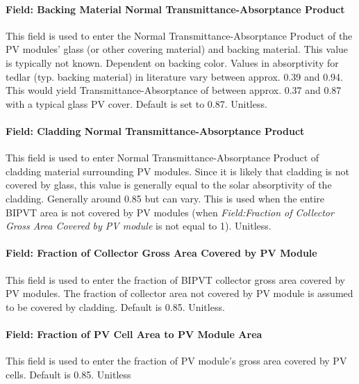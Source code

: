 \paragraph{Field: Backing Material Normal Transmittance-Absorptance Product}\label{BIPVT-field-backing-tau-alpha}

This field is used to enter the Normal Transmittance-Absorptance Product of the PV modules' glass (or other covering material) and backing material. This value is typically not known. Dependent on backing color. Values in absorptivity for tedlar (typ. backing material) in literature vary between approx. 0.39 and 0.94. This would yield Transmittance-Absorptance of between approx. 0.37 and 0.87 with a typical glass PV cover. Default is set to 0.87. Unitless.

\paragraph{Field: Cladding Normal Transmittance-Absorptance Product}\label{BIPVT-field-cladding-tau-alpha}

This field is used to enter Normal Transmittance-Absorptance Product of cladding material surrounding PV modules. Since it is likely that cladding is not covered by glass, this value is generally equal to the solar absorptivity of the cladding. Generally around 0.85 but can vary. This is used when the entire BIPVT area is not covered by PV modules (when \textit{Field:Fraction of Collector Gross Area Covered by PV module}  is not equal to 1). Unitless.


\paragraph{Field: Fraction of Collector Gross Area Covered by PV Module}\label{BIPVT-field-fraction-module}

This field is used to enter the fraction of BIPVT collector gross area covered by PV modules. The fraction of collector area not covered by PV module is assumed to be covered by cladding. Default is 0.85. Unitless.

\paragraph{Field: Fraction of PV Cell Area to PV Module Area}\label{BIPVT-field-fraction-PVcell}

This field is used to enter the fraction of PV module’s gross area covered by PV cells. Default is 0.85. Unitless


